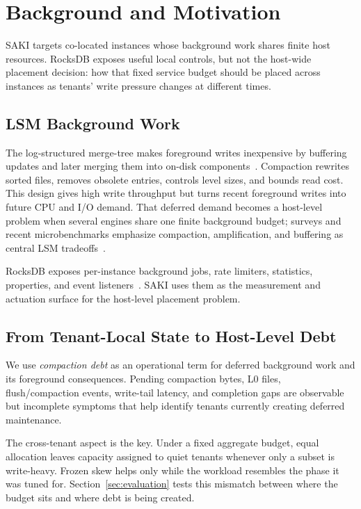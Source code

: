 \section{Background and Motivation}

SAKI targets co-located \rocksdb instances whose background work shares finite
host resources. RocksDB exposes useful local controls, but not the host-wide
placement decision: how that fixed service budget should be placed across
instances as tenants' write pressure changes at different times.

\subsection{LSM Background Work}

The log-structured merge-tree makes foreground writes inexpensive by buffering
updates and later merging them into on-disk components~\cite{oneil1996lsm}.
Compaction rewrites sorted files, removes obsolete entries, controls level
sizes, and bounds read cost. This design gives high write throughput but turns
recent foreground writes into future CPU and I/O demand. That deferred demand
becomes a host-level problem when several engines share one finite background
budget; surveys and recent microbenchmarks emphasize compaction, amplification,
and buffering as central LSM tradeoffs~\cite{luo2020lsmsurvey,
kaushik2024lsmbuffer}.

RocksDB exposes per-instance background jobs, rate limiters, statistics,
properties, and event listeners~\cite{rocksdb}. SAKI uses them as the
measurement and actuation surface for the host-level placement problem.

\subsection{From Tenant-Local State to Host-Level Debt}

We use \emph{compaction debt} as an operational term for deferred background
work and its foreground consequences. Pending compaction bytes, L0 files,
flush/compaction events, write-tail latency, and completion gaps are observable
but incomplete symptoms that help identify tenants currently creating deferred
maintenance.

The cross-tenant aspect is the key. Under a fixed aggregate budget, equal
allocation leaves capacity assigned to quiet tenants whenever only a subset is
write-heavy. Frozen skew helps only while the workload resembles the phase it was
tuned for. Section~\ref{sec:evaluation} tests this mismatch between where the
budget sits and where debt is being created.

